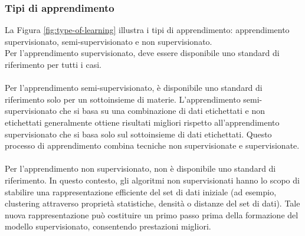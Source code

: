 \documentclass[12pt,a4paper]{report}
\begin{document}
\subsubsection{Tipi di apprendimento}
La Figura \ref{fig:type-of-learning} illustra i tipi di apprendimento: apprendimento supervisionato, semi-supervisionato e non supervisionato.\\
Per l'apprendimento supervisionato, deve essere disponibile uno standard di riferimento per tutti i casi.\\
\\
Per l'apprendimento semi-supervisionato, è disponibile uno standard di riferimento solo per un sottoinsieme di materie. L'apprendimento semi-supervisionato che si basa su una combinazione di dati etichettati e non etichettati generalmente ottiene risultati migliori rispetto all'apprendimento supervisionato che si basa solo sul sottoinsieme di dati etichettati. Questo processo di apprendimento combina tecniche non supervisionate e supervisionate.\\
\\
Per l'apprendimento non supervisionato, non è disponibile uno standard di riferimento. In questo contesto, gli algoritmi non supervisionati hanno lo scopo di stabilire una rappresentazione efficiente del set di dati iniziale (ad esempio, clustering attraverso proprietà statistiche, densità o distanze del set di dati). Tale nuova rappresentazione può costituire un primo passo prima della formazione del modello supervisionato, consentendo prestazioni migliori.
\end{document}

